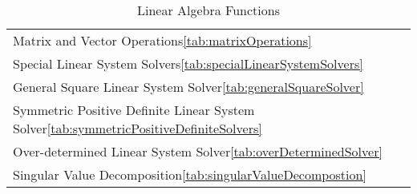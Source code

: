 \begin{table}[H]
\caption{Linear Algebra Functions}
\label{tab:linearAlgebraFunctions}
\begin{center}
\begin{tabular}{l}
Matrix and Vector Operations\ref{tab:matrixOperations}\\
Special Linear System Solvers\ref{tab:specialLinearSystemSolvers}\\
General Square Linear System Solver\ref{tab:generalSquareSolver}\\
Symmetric Positive Definite Linear System Solver\ref{tab:symmetricPositiveDefiniteSolvers}\\
Over-determined Linear System Solver\ref{tab:overDeterminedSolver}\\
Singular Value Decomposition\ref{tab:singularValueDecompostion}\\
\end{tabular}
\end{center}
\label{default}
\end{table}%